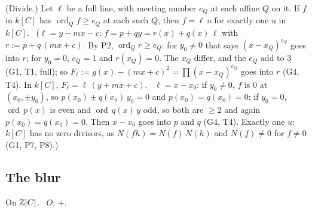 \begin{lines}
\item[\lab{P4}] (Divide.) Let $\ell$ be a full line, with meeting number $e_Q$ at each affine $Q$ on it. If $f$ in $k[C]$ has $\operatorname{ord}_Q f \ge e_Q$ at each such $Q$, then $f = \ell\,u$ for exactly one $u$ in $k[C]$. \ ($\ell = y - mx - c$: $f = p + qy = r(x) + q(x)\,\ell$ with $r := p + q\,(mx + c)$. By P2, $\operatorname{ord}_Q r \ge e_Q$: for $y_0 \ne 0$ that says $(x - x_Q)^{e_Q}$ goes into $r$; for $y_0 = 0$, $e_Q = 1$ and $r(x_Q) = 0$. The $x_Q$ differ, and the $e_Q$ add to $3$ (G1, T1, full); so $F_\ell := g(x) - (mx + c)^2 = \prod (x - x_Q)^{e_Q}$ goes into $r$ (G4, T4). In $k[C]$, $F_\ell = \ell\,(y + mx + c)$. \ $\ell = x - x_0$: if $y_0 \ne 0$, $f$ is $0$ at $(x_0, \pm y_0)$, so $p(x_0) \pm q(x_0)\,y_0 = 0$ and $p(x_0) = q(x_0) = 0$; if $y_0 = 0$, $\operatorname{ord}\,p(x)$ is even and $\operatorname{ord}\,q(x)\,y$ odd, so both are $\ge 2$ and again $p(x_0) = q(x_0) = 0$. Then $x - x_0$ goes into $p$ and $q$ (G4, T4). Exactly one $u$: $k[C]$ has no zero divisors, as $N(fh) = N(f)\,N(h)$ and $N(f) \ne 0$ for $f \ne 0$ (G1, P7, P8).)
\end{lines}

\subsection*{The blur}

On $\mathbb{Z}[C]$. \ $O$: $+$.

